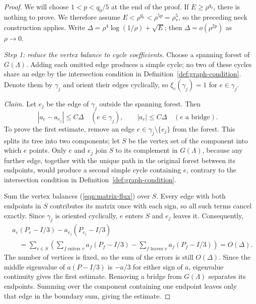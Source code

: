 \documentclass[11pt,a4paper]{article}
\numberwithin{equation}{section}
\theoremstyle{definition}
\theoremstyle{remark}
\begin{document}
	\begin{proof}
		We will choose $1<p<q_0/5$ at the end of the proof.
		If $E\ge\rho^{q_0}$, there is nothing to prove. We therefore assume
		$E<\rho^{q_0}<\rho^{5p}=\rho_*^5$, so the preceding neck construction
		applies. Write $\Delta=\rho^4\log(1/\rho)+\sqrt E$;
		then $\Delta=o(\rho^{2p})$ as $\rho\to0$.
		
		\smallskip
		\noindent\emph{Step 1: reduce the vertex balance to cycle coefficients.}
		Choose a spanning forest of $G(\Lambda)$. Adding each omitted edge produces a simple
		cycle; no two of these cycles share an edge by the intersection condition
		in Definition~\ref{def:graph-condition}.
		Denote them by $\gamma_j$ and orient their edges cyclically, so
		$\xi_e(\gamma_j)=1$ for $e\in \gamma_j$.
		
		\emph{Claim.} Let $e_j$ be the edge of $\gamma_j$ outside the spanning forest.
		Then
		\[
		|a_e-a_{e_j}|\le C\Delta\quad(e\in \gamma_j),\qquad
		|a_e|\le C\Delta\quad(e\text{ a bridge}).
		\]
		To prove the first estimate, remove an edge $e\in \gamma_j\setminus\{e_j\}$
		from the forest. This splits its tree into two components; let $S$
		be the vertex set of the component into which $e$ points.
		Only $e$ and $e_j$ join $S$ to its complement in $G(\Lambda)$, because
		any further edge, together with the unique path in the original forest
		between its endpoints, would produce a second simple cycle containing
		$e$, contrary to the intersection condition in
		Definition~\ref{def:graph-condition}.
		
		Sum the vertex balances (\ref{eqn:matrix-flux}) over $S$.
		Every edge with both endpoints in $S$ contributes its matrix once with
		each sign, so all such terms cancel exactly. Since $\gamma_j$ is oriented
		cyclically, $e$ enters $S$ and $e_j$ leaves it. Consequently,
		\[
		\begin{aligned}
			&a_e(P_e-I/3)-a_{e_j}(P_{e_j}-I/3)\\
			&\quad=\sum_{v\in S}\left(
			\sum_{f\text{ enters }v}a_f(P_f-I/3)
			-\sum_{f\text{ leaves }v}a_f(P_f-I/3)\right)
			=O(\Delta).
		\end{aligned}
		\]
		The number of vertices is fixed, so the sum of the errors is still
		$O(\Delta)$.
		Since the middle eigenvalue of $a(P-I/3)$ is $-a/3$ for either sign
		of $a$, eigenvalue continuity gives the first estimate.
		Removing a bridge from $G(\Lambda)$ separates its endpoints.
		Summing over the component containing one endpoint leaves only that
		edge in the boundary sum, giving the estimate.
		

\end{proof}
\end{document}
